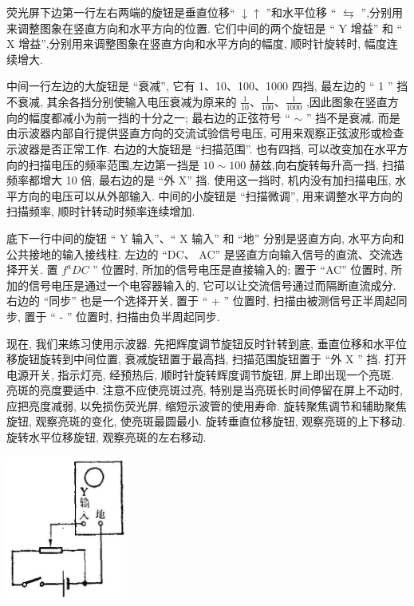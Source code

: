 \documentclass[10pt]{article}
\begin{document}
荧光屏下边第一行左右两端的旋钮是垂直位移“ \(\downarrow \uparrow\) ”和水平位移 “ \(\leftrightarrows\) ”,分别用来调整图象在竖直方向和水平方向的位置. 它们中间的两个旋钮是 “ \(\mathrm{Y}\) 增益” 和 “ \(\mathrm{X}\) 增益”,分别用来调整图象在竖直方向和水平方向的幅度, 顺时针旋转时, 幅度连续增大.

中间一行左边的大旋钮是 “衰减”, 它有 1、10、100、1000 四挡, 最左边的 “ 1 ” 挡不衰减, 其余各挡分别使输入电压衰减为原来的 \(\frac{1}{10}\text{、}\frac{1}{100}\text{、}\frac{1}{1000}\) ,因此图象在竖直方向的幅度都减小为前一挡的十分之一; 最右边的正弦符号 “ \(\sim\) ” 挡不是衰减, 而是由示波器内部自行提供竖直方向的交流试验信号电压, 可用来观察正弦波形或检查示波器是否正常工作. 右边的大旋钮是 “扫描范围”. 也有四挡, 可以改变加在水平方向的扫描电压的频率范围,左边第一挡是 \({10} \sim {100}\) 赫兹,向右旋转每升高一挡, 扫描频率都增大 10 倍, 最右边的是 “外 X” 挡. 使用这一挡时, 机内没有加扫描电压, 水平方向的电压可以从外部输入. 中间的小旋钮是 “扫描微调”, 用来调整水平方向的扫描频率, 顺时针转动时频率连续增加.

底下一行中间的旋钮 “ \(\mathrm{Y}\) 输入”、“ \(\mathrm{X}\) 输入” 和 “地” 分别是竖直方向, 水平方向和公共接地的输入接线柱. 左边的 “DC、 AC” 是竖直方向输入信号的直流、交流选择开关. 置 \({f}^{a}{DC}\) ” 位置时, 所加的信号电压是直接输入的; 置于 “AC” 位置时, 所加的信号电压是通过一个电容器输入的, 它可以让交流信号通过而隔断直流成分. 右边的 “同步” 也是一个选择开关, 置于 “ + ” 位置时, 扫描由被测信号正半周起同步, 置于 “ - ” 位置时, 扫描由负半周起同步.

现在, 我们来练习使用示波器. 先把辉度调节旋钮反时针转到底, 垂直位移和水平位移旋钮旋转到中间位置, 衰减旋钮置于最高挡, 扫描范围旋钮置于 “外 \(\mathrm{X}\) ” 挡. 打开电源开关, 指示灯亮, 经预热后, 顺时针旋转辉度调节旋钮, 屏上即出现一个亮斑. 亮斑的亮度要适中. 注意不应使亮斑过亮, 特别是当亮斑长时间停留在屏上不动时, 应把亮度减弱, 以免损伤荧光屏, 缩短示波管的使用寿命. 旋转聚焦调节和辅助聚焦旋钮, 观察亮斑的变化, 使亮斑最圆最小. 旋转垂直位移旋钮, 观察亮斑的上下移动. 旋转水平位移旋钮, 观察亮斑的左右移动.

\begin{center}
\includegraphics[max width=0.3\textwidth]{images/01913056-1f15-74d8-9184-9aab52c9d66b_374_132232.jpg}
\end{center}
\end{document}
